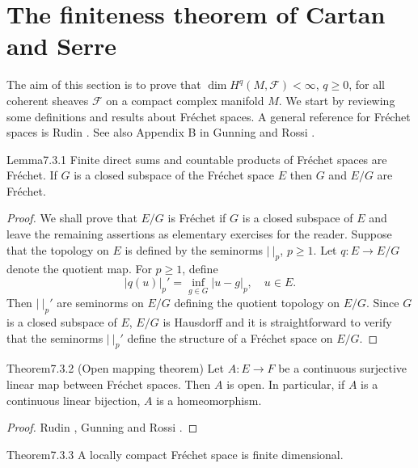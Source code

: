 \section{The finiteness theorem of Cartan and Serre}\label{sec:7:3}
The aim of this section is to prove that $\dim H^q(M,\mathcal F)<\infty$, $q\geq0$, for all coherent sheaves $\mathcal F$ on a compact complex manifold $M$. We start by reviewing some definitions and results about Fr\'echet spaces. A general reference for Fr\'echet spaces is Rudin \cite{bib:II:rudin-w:1}. See also Appendix B in Gunning and Rossi \cite{bib:II:gunning-r-c-and-rossi-h:1}.
\begin{originaltheorem}{Lemma}{7.3.1}
Finite direct sums and countable products of Fr\'echet spaces are Fr\'echet. If $G$ is a closed subspace of the Fr\'echet space $E$ then $G$ and $E/G$ are Fr\'echet.
\end{originaltheorem}
\begin{proof}
We shall prove that $E/G$ is Fr\'echet if $G$ is a closed subspace of $E$ and leave the remaining assertions as elementary exercises for the reader. Suppose that the topology on $E$ is defined by the seminorms $|\ |_p$, $p\geq1$. Let $q:E\to E/G$ denote the quotient map. For $p\geq1$, define
\[
|q(u)|_p'=\inf_{g\in G}|u-g|_p,\quad u\in E.
\]
Then $|\ |_p'$ are seminorms on $E/G$ defining the quotient topology on $E/G$. Since $G$ is a closed subspace of $E$, $E/G$ is Hausdorff and it is straightforward to verify that the seminorms $|\ |_p'$ define the structure of a Fr\'echet space on $E/G$.
\end{proof}
\begin{originaltheorem}{Theorem}{7.3.2 (Open mapping theorem)}
Let $A:E\to F$ be a continuous surjective linear map between Fr\'echet spaces. Then $A$ is open. In particular, if $A$ is a continuous linear bijection, $A$ is a homeomorphism.
\end{originaltheorem}
\begin{proof}
Rudin \cite[Corollary 2.12]{bib:II:rudin-w:1}, Gunning and Rossi \cite[Appendix B]{bib:II:gunning-r-c-and-rossi-h:1}.
\end{proof}
\begin{originaltheorem}{Theorem}{7.3.3}
A locally compact Fr\'echet space is finite dimensional.
\end{originaltheorem}
